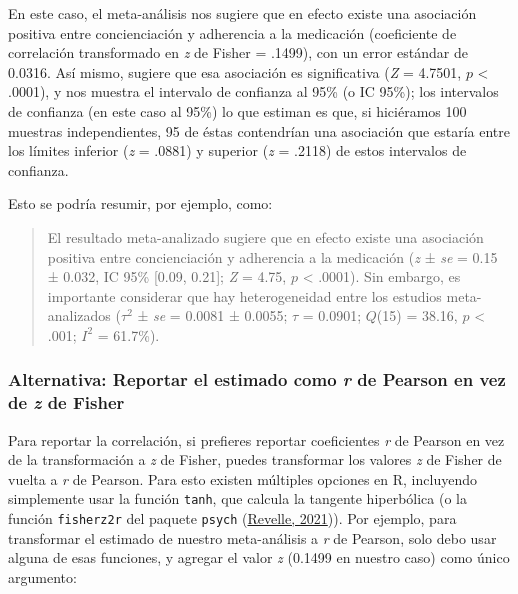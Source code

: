 \documentclass[
  bookmarksnumbered]{article}
\begin{document}
En este caso, el meta-análisis nos sugiere que en efecto existe una asociación positiva entre concienciación y adherencia a la medicación (coeficiente de correlación transformado en \emph{z} de Fisher = .1499), con un error estándar de 0.0316. Así mismo, sugiere que esa asociación es significativa (\emph{Z} = 4.7501, \(p\) \textless{} .0001), y nos muestra el intervalo de confianza al 95\% (o IC 95\%); los intervalos de confianza (en este caso al 95\%) lo que estiman es que, si hiciéramos 100 muestras independientes, 95 de éstas contendrían una asociación que estaría entre los límites inferior (\emph{z} = .0881) y superior (\emph{z} = .2118) de estos intervalos de confianza.

Esto se podría resumir, por ejemplo, como:

\begin{quote}
El resultado meta-analizado sugiere que en efecto existe una asociación positiva entre concienciación y adherencia a la medicación (\emph{z} ± \emph{se} = 0.15 ± 0.032, IC 95\% {[}0.09, 0.21{]}; \emph{Z} = 4.75, \(p\) \textless{} .0001). Sin embargo, es importante considerar que hay heterogeneidad entre los estudios meta-analizados (\(\tau^2\) ± \emph{se} = 0.0081 ± 0.0055; \(\tau\) = 0.0901; \(Q\)(15) = 38.16, \(p\) \textless{} .001; \(I^2\) = 61.7\%).
\end{quote}

\hypertarget{alternativa-reportar-el-estimado-como-r-de-pearson-en-vez-de-z-de-fisher}{%
\subsubsection{\texorpdfstring{Alternativa: Reportar el estimado como \emph{r} de Pearson en vez de \emph{z} de Fisher}{Alternativa: Reportar el estimado como r de Pearson en vez de z de Fisher}}\label{alternativa-reportar-el-estimado-como-r-de-pearson-en-vez-de-z-de-fisher}}

Para reportar la correlación, si prefieres reportar coeficientes \emph{r} de Pearson en vez de la transformación a \emph{z} de Fisher, puedes transformar los valores \emph{z} de Fisher de vuelta a \emph{r} de Pearson. Para esto existen múltiples opciones en R, incluyendo simplemente usar la función \texttt{tanh}, que calcula la tangente hiperbólica (o la función \texttt{fisherz2r} del paquete \texttt{psych} (\protect\hyperlink{ref-revellePsych2021}{Revelle, 2021})). Por ejemplo, para transformar el estimado de nuestro meta-análisis a \emph{r} de Pearson, solo debo usar alguna de esas funciones, y agregar el valor \emph{z} (0.1499 en nuestro caso) como único argumento:
\end{document}
